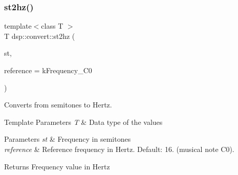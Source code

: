 \subsubsection{\texorpdfstring{st2hz()}{st2hz()}}
{\footnotesize\ttfamily template$<$class T $>$ \\
T dsp\+::convert\+::st2hz (\begin{DoxyParamCaption}\item[{T}]{st,  }\item[{T}]{reference = {\ttfamily kFrequency\+\_\+C0} }\end{DoxyParamCaption})}



Converts from semitones to Hertz. 


\begin{DoxyTemplParams}{Template Parameters}
{\em T} & Data type of the values \\
\hline
\end{DoxyTemplParams}

\begin{DoxyParams}{Parameters}
{\em st} & Frequency in semitones \\
\hline
{\em reference} & Reference frequency in Hertz. Default\+: 16. (musical note C0). \\
\hline
\end{DoxyParams}
\begin{DoxyReturn}{Returns}
Frequency value in Hertz 
\end{DoxyReturn}
